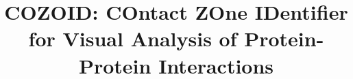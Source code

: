 \documentclass[twocolumn]{bmcart}%
\begin{document}
\begin{frontmatter}

\begin{fmbox}


\title{COZOID: COntact ZOne IDentifier for Visual Analysis of Protein-Protein Interactions}

\author[
   addressref={aff1},
   email={furmanova@mail.muni.cz}
]{ }
\author[
   addressref={aff2},     %
   email={jan.byska@gmail.com}   %
]{ }
\author[
   addressref={aff3},             %
   email={groeller@cg.tuwien.ac.at}   %
]{ }
\author[
   addressref={aff3},             %
   email={viola@cg.tuwien.ac.at}   %
]{ }
\author[
   addressref={aff4, aff5},             %
   email={jpalecek@sci.muni.cz}   %
]{ }
\author[
   addressref={aff1},             %
   corref={aff1},
   email={kozlikova@fi.muni.cz}   %
]{ }



\end{fmbox}
\end{frontmatter}
\end{document}

